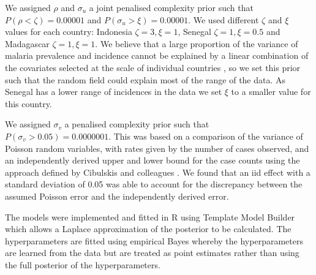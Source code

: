 \documentclass{statsoc}
\begin{document}
We assigned $\rho$ and $\sigma_u$ a joint penalised complexity prior \citep{fuglstad2018constructing} such that $P(\rho < \zeta) = 0.00001$ and $P(\sigma_u > \xi) = 0.00001$.
We used different $\zeta$  and $\xi$ values for each country: Indonesia $\zeta = 3, \xi = 1$, Senegal $\zeta = 1, \xi = 0.5$ and Madagascar $\zeta = 1, \xi = 1$.
We believe that a large proportion of the variance of malaria prevalence and incidence cannot be explained by a linear combination of the covariates selected at the scale of individual countries \citep{bhatt2017improved}, so we set this prior such that the random field could explain most of the range of the data.
As Senegal has a lower range of incidences in the data we set $\xi$ to a smaller value for this country.

We assigned $\sigma_v$ a penalised complexity prior \citep{simpson2017penalising} such that $P(\sigma_v > 0.05) = 0.0000001$.
This was based on a comparison of the variance of Poisson random variables, with rates given by the number of cases observed, and an independently derived upper and lower bound for the case counts using the approach defined by Cibulskis and colleagues \citep{cibulskis2011worldwide}.
We found that an iid effect with a standard deviation of 0.05 was able to account for the discrepancy between the assumed Poisson error and the independently derived error.

The models were implemented and fitted in R \citep{R} using Template Model Builder \citep{TMB} which allows a Laplace approximation of the posterior to be calculated.
The hyperparameters are fitted using empirical Bayes whereby the hyperparameters are learned from the data but are treated as point estimates rather than using the full posterior of the hyperparameters.

%
%
%
%
%
%
%
\end{document}
